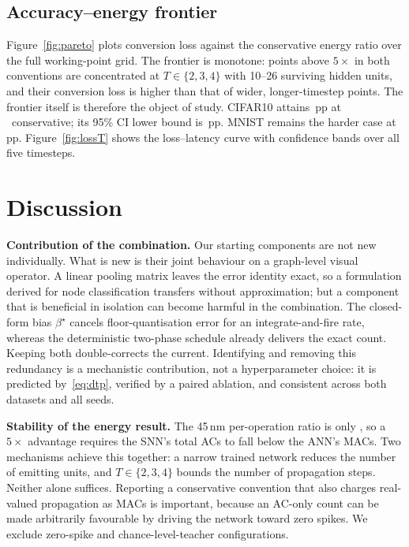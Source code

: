 \subsection{Accuracy--energy frontier}
\label{ssec:frontier}

Figure~\ref{fig:pareto} plots conversion loss against the conservative energy ratio over the full working-point grid. The frontier is monotone: points above $5\times$ in both conventions are concentrated at $T\in\{2,3,4\}$ with 10--26 surviving hidden units, and their conversion loss is higher than that of wider, longer-timestep points. The frontier itself is therefore the object of study. CIFAR10 attains \CIFARLoss\,pp at \CIFAREc\texttimes\ conservative; its 95\% CI lower bound is \CIFARLower\,pp. MNIST remains the harder case at \MNISTLoss\,pp. Figure~\ref{fig:lossT} shows the loss--latency curve with confidence bands over all five timesteps.

\section{Discussion}
\label{sec:discussion}

\textbf{Contribution of the combination.} Our starting components are not new individually. What is new is their joint behaviour on a graph-level visual operator. A linear pooling matrix leaves the error identity exact, so a formulation derived for node classification transfers without approximation; but a component that is beneficial in isolation can become harmful in the combination. The closed-form bias $\beta^\star$ cancels floor-quantisation error for an integrate-and-fire rate, whereas the deterministic two-phase schedule already delivers the exact count. Keeping both double-corrects the current. Identifying and removing this redundancy is a mechanistic contribution, not a hyperparameter choice: it is predicted by~\eqref{eq:dtp}, verified by a paired ablation, and consistent across both datasets and all seeds.

\textbf{Stability of the energy result.} The 45\,nm per-operation ratio is only \MACACRatio, so a $5\times$ advantage requires the SNN's total ACs to fall below the ANN's MACs. Two mechanisms achieve this together: a narrow trained network reduces the number of emitting units, and $T\in\{2,3,4\}$ bounds the number of propagation steps. Neither alone suffices. Reporting a conservative convention that also charges real-valued propagation as MACs is important, because an AC-only count can be made arbitrarily favourable by driving the network toward zero spikes. We exclude zero-spike and chance-level-teacher configurations.

